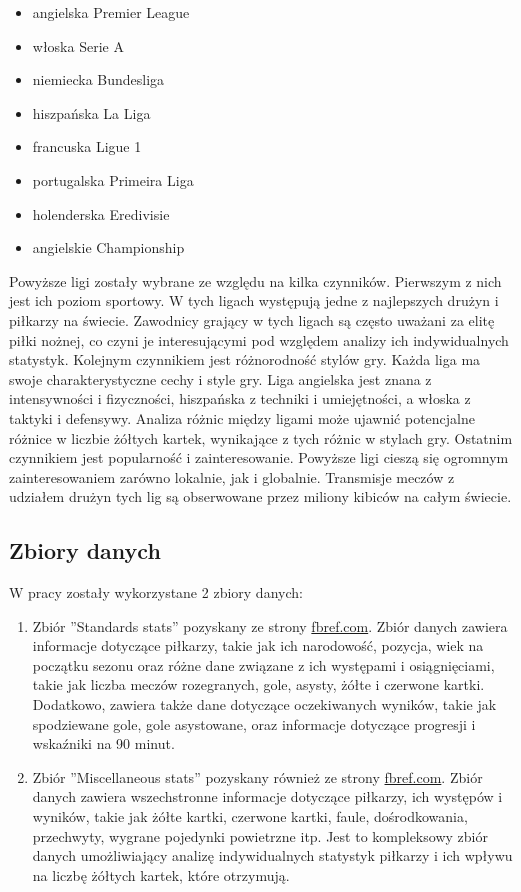 \documentclass{article}
\begin{document}
\begin{itemize}
    \item angielska Premier League
    \item włoska Serie A
    \item niemiecka Bundesliga
    \item hiszpańska La Liga
    \item francuska Ligue 1
    \item portugalska Primeira Liga
    \item holenderska Eredivisie
    \item angielskie Championship
\end{itemize}

Powyższe ligi zostały wybrane ze względu na kilka czynników. Pierwszym z nich jest ich poziom sportowy. W tych ligach występują jedne z najlepszych drużyn i piłkarzy na świecie. Zawodnicy grający w tych ligach są często uważani za elitę piłki nożnej, co czyni je interesującymi pod względem analizy ich indywidualnych statystyk. Kolejnym czynnikiem jest różnorodność stylów gry. Każda liga ma swoje charakterystyczne cechy i style gry. Liga angielska jest znana z intensywności i fizyczności, hiszpańska z techniki i umiejętności, a włoska z taktyki i defensywy. Analiza różnic między ligami może ujawnić potencjalne różnice w liczbie żółtych kartek, wynikające z tych różnic w stylach gry. Ostatnim czynnikiem jest popularność i zainteresowanie. Powyższe ligi  cieszą się ogromnym zainteresowaniem zarówno lokalnie, jak i globalnie. Transmisje meczów z udziałem drużyn tych lig są obserwowane przez miliony kibiców na całym świecie. 

\subsection{Zbiory danych}

W pracy zostały wykorzystane 2 zbiory danych:

\begin{enumerate}
    \item Zbiór ”Standards stats” pozyskany ze strony \href{https://fbref.com/en/}{fbref.com}. Zbiór danych zawiera informacje dotyczące piłkarzy, takie jak ich narodowość, pozycja, wiek na początku sezonu oraz różne dane związane z ich występami i osiągnięciami, takie jak liczba meczów rozegranych, gole, asysty, żółte i czerwone kartki. Dodatkowo, zawiera także dane dotyczące oczekiwanych wyników, takie jak spodziewane gole, gole asystowane, oraz informacje dotyczące progresji i wskaźniki na 90 minut. 
    \item Zbiór ”Miscellaneous stats” pozyskany również ze strony \href{https://fbref.com/en/}{fbref.com}. Zbiór danych zawiera wszechstronne informacje dotyczące piłkarzy, ich występów i wyników, takie jak żółte kartki, czerwone kartki, faule, dośrodkowania, przechwyty, wygrane pojedynki powietrzne itp. Jest to kompleksowy zbiór danych umożliwiający analizę indywidualnych statystyk piłkarzy i ich wpływu na liczbę żółtych kartek, które otrzymują.
\end{enumerate}
\end{document}
